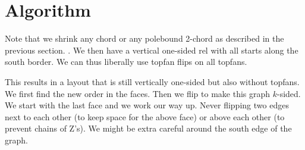 \section{Algorithm}
Note that we shrink any chord or any polebound 2-chord as described in the previous section. . We then have a vertical one-sided rel with all starts along the south border. We can thus liberally use topfan flips on all topfans.

This results in a layout that is still vertically one-sided but also without topfans. We first find the new order in the faces. Then we flip to make this graph $k$-sided. We start with the last face and we work our way up. Never flipping two edges next to each other (to keep space for the above face) or above each other (to prevent chains of Z's). We might be extra careful around the south edge of the graph.
